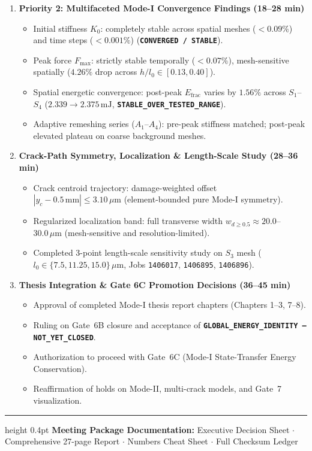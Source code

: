 \documentclass[10pt,a4paper]{article}
\begin{document}
\begin{enumerate}[label=\textbf{\arabic*.},leftmargin=5mm,itemsep=2.5pt,topsep=1.5pt]
  \item \textbf{Priority 2: Multifaceted Mode-I Convergence Findings (18--28 min)}
  \begin{itemize}[itemsep=0.8pt,topsep=0.8pt,leftmargin=4mm]
    \small
    \item Initial stiffness $K_0$: completely stable across spatial meshes ($<0.09\%$) and time steps ($<0.001\%$) (\textbf{\texttt{CONVERGED / STABLE}}).
    \item Peak force $F_{\max}$: strictly stable temporally ($<0.07\%$), mesh-sensitive spatially ($4.26\%$ drop across $h/l_0 \in [0.13, 0.40]$).
    \item Spatial energetic convergence: post-peak $E_{\mathrm{frac}}$ varies by $1.56\%$ across $S_1$--$S_4$ ($2.339 \to 2.375\,\mathrm{mJ}$, \textbf{\texttt{STABLE\_OVER\_\allowbreak TESTED\_\allowbreak RANGE}}).
    \item Adaptive remeshing series ($A_1$--$A_4$): pre-peak stiffness matched; post-peak elevated plateau on coarse background meshes.
  \end{itemize}

  \item \textbf{Crack-Path Symmetry, Localization \& Length-Scale Study (28--36 min)}
  \begin{itemize}[itemsep=0.8pt,topsep=0.8pt,leftmargin=4mm]
    \small
    \item Crack centroid trajectory: damage-weighted offset $|y_c - 0.5\,\mathrm{mm}| \le 3.10\,\mu\mathrm{m}$ (element-bounded pure Mode-I symmetry).
    \item Regularized localization band: full transverse width $w_{d \ge 0.5} \approx 20.0$--$30.0\,\mu\mathrm{m}$ (mesh-sensitive and resolution-limited).
    \item Completed 3-point length-scale sensitivity study on $S_3$ mesh ($l_0 \in \{7.5, 11.25, 15.0\}\,\mu\mathrm{m}$, Jobs \texttt{1406017}, \texttt{1406895}, \texttt{1406896}).
  \end{itemize}

  \item \textbf{Thesis Integration \& Gate 6C Promotion Decisions (36--45 min)}
  \begin{itemize}[itemsep=0.8pt,topsep=0.8pt,leftmargin=4mm]
    \small
    \item Approval of completed Mode-I thesis report chapters (Chapters 1--3, 7--8).
    \item Ruling on Gate~6B closure and acceptance of \textbf{\texttt{GLOBAL\_ENERGY\_IDENTITY --- NOT\_YET\_CLOSED}}.
    \item Authorization to proceed with Gate~6C (Mode-I State-Transfer Energy Conservation).
    \item Reaffirmation of holds on Mode-II, multi-crack models, and Gate~7 visualization.
  \end{itemize}
\end{enumerate}

\vfill
\hrule height 0.4pt
\vspace{0.18em}
{\scriptsize\textbf{Meeting Package Documentation:} Executive Decision Sheet $\cdot$ Comprehensive 27-page Report $\cdot$ Numbers Cheat Sheet $\cdot$ Full Checksum Ledger}
\end{document}
